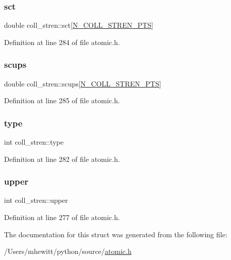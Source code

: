 \subsubsection{\texorpdfstring{sct}{sct}}
{\footnotesize\ttfamily double coll\+\_\+stren\+::sct\mbox{[}\hyperlink{atomic_8h_a83f9db7d66ceb630d0e4427329ae7d16}{N\+\_\+\+C\+O\+L\+L\+\_\+\+S\+T\+R\+E\+N\+\_\+\+P\+TS}\mbox{]}}



Definition at line 284 of file atomic.\+h.

\mbox{\label{structcoll__stren_af52c6023237c8ab4daff6f682ef01553}} 
\subsubsection{\texorpdfstring{scups}{scups}}
{\footnotesize\ttfamily double coll\+\_\+stren\+::scups\mbox{[}\hyperlink{atomic_8h_a83f9db7d66ceb630d0e4427329ae7d16}{N\+\_\+\+C\+O\+L\+L\+\_\+\+S\+T\+R\+E\+N\+\_\+\+P\+TS}\mbox{]}}



Definition at line 285 of file atomic.\+h.

\mbox{\label{structcoll__stren_a292d3309ec1d6c9ae5f7afb2c401b162}} 
\subsubsection{\texorpdfstring{type}{type}}
{\footnotesize\ttfamily int coll\+\_\+stren\+::type}



Definition at line 282 of file atomic.\+h.

\mbox{\label{structcoll__stren_a1a42740229c63647a0a0f2de0cc6ce9f}} 
\subsubsection{\texorpdfstring{upper}{upper}}
{\footnotesize\ttfamily int coll\+\_\+stren\+::upper}



Definition at line 277 of file atomic.\+h.



The documentation for this struct was generated from the following file\+:\begin{DoxyCompactItemize}
\item 
/\+Users/mhewitt/python/source/\hyperlink{atomic_8h}{atomic.\+h}\end{DoxyCompactItemize}
